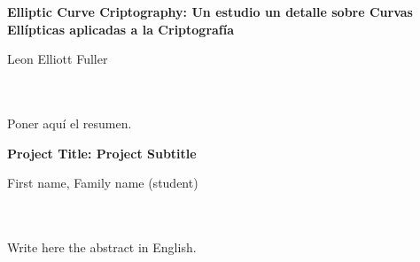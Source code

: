 \chapter*{}






\cleardoublepage
\thispagestyle{empty}

\begin{center}
{\large\bfseries Elliptic Curve Criptography: Un estudio un detalle sobre Curvas Ellípticas aplicadas a la Criptografía}\\
\end{center}
\begin{center}
Leon Elliott Fuller\\
\end{center}

\\

\vspace{0.7cm}
\\

Poner aquí el resumen.
\cleardoublepage


\thispagestyle{empty}


\begin{center}
{\large\bfseries Project Title: Project Subtitle}\\
\end{center}
\begin{center}
First name, Family name (student)\\
\end{center}

\\

\vspace{0.7cm}
\\

Write here the abstract in English.

\chapter*{}
\thispagestyle{empty}

